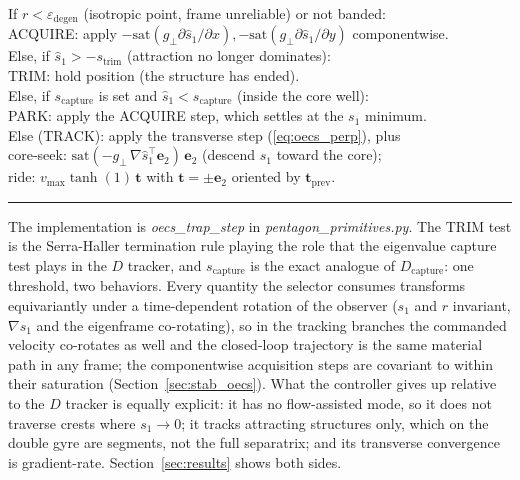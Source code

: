 \documentclass[lettersize,journal]{IEEEtran}
\begin{document}
\vspace{3pt}
\noindent If $r < \varepsilon_{\text{degen}}$ (isotropic point, frame
unreliable) or not banded:\\
\hspace*{1.5em} ACQUIRE: apply
$-\mathrm{sat}(g_\perp \partial\hat{s}_1/\partial x),
 -\mathrm{sat}(g_\perp \partial\hat{s}_1/\partial y)$
componentwise.\\
Else, if $\hat{s}_1 > -s_{\text{trim}}$ (attraction no longer
dominates):\\
\hspace*{1.5em} TRIM: hold position (the structure has ended).\\
Else, if $s_{\text{capture}}$ is set and $\hat{s}_1 <
s_{\text{capture}}$ (inside the core well):\\
\hspace*{1.5em} PARK: apply the ACQUIRE step, which settles at the
$s_1$ minimum.\\
Else (TRACK): apply the transverse step (\ref{eq:oecs_perp}), plus\\
\hspace*{1.5em} core-seek: $\mathrm{sat}(-g_\perp\,
\nabla\hat{s}_1^\top \mathbf{e}_2)\,\mathbf{e}_2$ (descend $s_1$ toward
the core);\\
\hspace*{1.5em} ride: $v_{\max}\tanh(1)\,\mathbf{t}$ with $\mathbf{t} =
\pm\mathbf{e}_2$ oriented by $\mathbf{t}_{\text{prev}}$.
\vspace{4pt}
\hrule
\vspace{4pt}

The implementation is \textit{oecs\_trap\_step} in
\textit{pentagon\_primitives.py}. The TRIM test is the Serra-Haller
termination rule playing the role that the eigenvalue capture test
plays in the $D$ tracker, and $s_{\text{capture}}$ is the exact analogue of
$D_{\text{capture}}$: one threshold, two behaviors. Every quantity the
selector consumes transforms equivariantly under a time-dependent
rotation of the observer ($s_1$ and $r$ invariant, $\nabla s_1$ and the
eigenframe co-rotating), so in the tracking branches the commanded
velocity co-rotates as well and the closed-loop trajectory is the same
material path in any frame; the componentwise acquisition steps are
covariant to within their saturation (Section~\ref{sec:stab_oecs}). What the controller gives up relative to
the $D$ tracker is equally explicit: it has no flow-assisted mode, so it does
not traverse crests where $s_1 \to 0$; it tracks attracting structures
only, which on the double gyre are segments, not the full separatrix;
and its transverse convergence is gradient-rate. Section~\ref{sec:results}
shows both sides.
\end{document}
